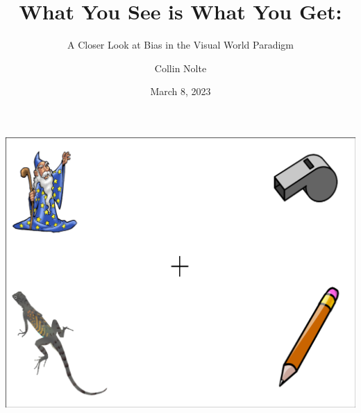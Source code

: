 \documentclass{beamer}
\title[Public Defense]{What You See is What You Get:}
\subtitle{A Closer Look at Bias in the Visual World Paradigm}
\author{Collin Nolte}
\date{March 8, 2023}
\begin{document}
\begin{frame}
  \titlepage
\end{frame}


\begin{frame}
\begin{center}
\includegraphics[scale=0.35]{img/wizard_lizard_whistle_pencil.png}
\end{center}
\end{frame}

%
\end{document}
